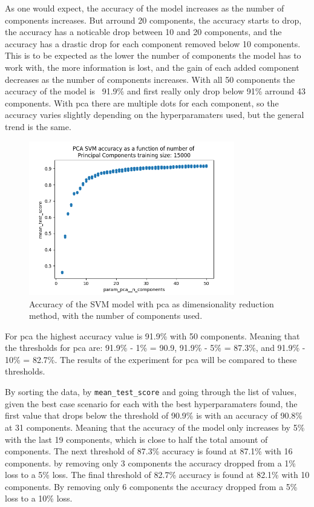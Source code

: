As one would expect, the accuracy of the model increases as the number of components increases. But arround 20 components, the accuracy starts to drop, the accuracy has a noticable drop between 10 and 20 components, and the accuracy has a drastic drop for each component removed below 10 components. This is to be expected as the lower the number of components the model has to work with, the more information is lost, and the gain of each added component decreases as the number of components increases. With all 50 components the accuracy of the model is ~91.9\% and first really only drop below 91\% arround 43 components. With \gls{pca} there are multiple dots for each component, so the accuracy varies slightly depending on the hyperparamaters used, but the general trend is the same.

\begin{figure}[htb!]
    \centering
    \includegraphics[width=0.8\textwidth]{figures/experiment_two/pca_svm_15000.png}
    \caption{Accuracy of the SVM model with \gls{pca} as dimensionality reduction method, with the number of components used.}
    \label{fig:experiment_2_pca_svm}
\end{figure}

For \gls{pca} the highest accuracy value is 91.9\% with 50 components. Meaning that the thresholds for \gls{pca} are: 91.9\% - 1\% = 90.9, 91.9\% - 5\% = 87.3\%, and 91.9\% - 10\% = 82.7\%. The results of the experiment for \gls{pca} will be compared to these thresholds. 

By sorting the data, by \texttt{mean\_test\_score} and going through the list of values, given the best case scenario for each with the best hyperparamaters found, the first value that drops below the threshold of 90.9\% is with an accuracy of 90.8\% at 31 components. Meaning that the accuracy of the model only increases by 5\% with the last 19 components, which is close to half the total amount of components.
The next threshold of 87.3\% accuracy is found at 87.1\% with 16 components. by removing only 3 components the accuracy dropped from a 1\% loss to a 5\% loss. 
The final threshold of 82.7\% accuracy is found at 82.1\% with 10 components. By removing only 6 components the accuracy dropped from a 5\% loss to a 10\% loss.

